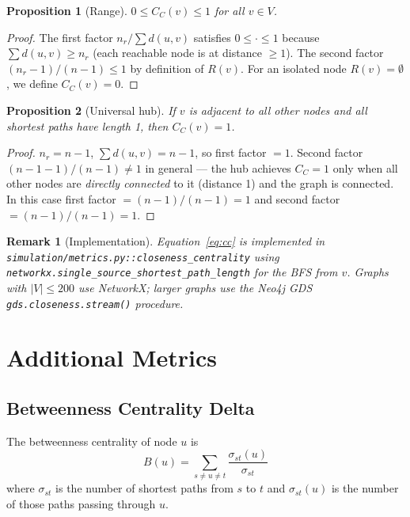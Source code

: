 \documentclass[12pt, a4paper]{article}
\newtheorem{proposition}{Proposition}
\newtheorem{remark}{Remark}
\begin{document}
\begin{proposition}[Range]
$0 \leq C_C(v) \leq 1$ for all $v \in V$.
\end{proposition}
\begin{proof}
The first factor $n_r / \sum d(u,v)$ satisfies $0 \leq \cdot \leq 1$ because
$\sum d(u,v) \geq n_r$ (each reachable node is at distance $\geq 1$).  The
second factor $(n_r - 1)/(n-1) \leq 1$ by definition of $R(v)$.
For an isolated node $R(v) = \emptyset$, we define $C_C(v) = 0$.
\end{proof}

\begin{proposition}[Universal hub]
If $v$ is adjacent to all other nodes and all shortest paths have length 1,
then $C_C(v) = 1$.
\end{proposition}
\begin{proof}
$n_r = n-1$, $\sum d(u,v) = n-1$, so first factor $= 1$.
Second factor $(n-1-1)/(n-1) \neq 1$ in general --- the hub achieves $C_C = 1$
only when all other nodes are \emph{directly connected} to it (distance 1) and
the graph is connected.  In this case first factor $= (n-1)/(n-1) = 1$ and
second factor $= (n-1)/(n-1) = 1$.
\end{proof}

\begin{remark}[Implementation]
Equation~\ref{eq:cc} is implemented in \texttt{simulation/metrics.py::closeness\_centrality}
using \texttt{networkx.single\_source\_shortest\_path\_length} for the BFS from $v$.
Graphs with $|V| \leq 200$ use NetworkX; larger graphs use the Neo4j GDS
\texttt{gds.closeness.stream()} procedure.
\end{remark}

\section{Additional Metrics}

\subsection{Betweenness Centrality Delta}

The betweenness centrality of node $u$ is
\[
  B(u) = \sum_{s \neq u \neq t} \frac{\sigma_{st}(u)}{\sigma_{st}}
\]
where $\sigma_{st}$ is the number of shortest paths from $s$ to $t$ and
$\sigma_{st}(u)$ is the number of those paths passing through $u$.
\end{document}
